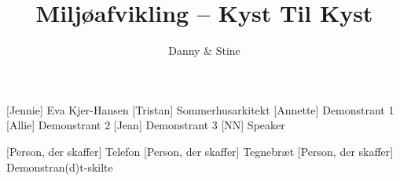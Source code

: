 \documentclass[a4paper,11pt]{article}
\title{Miljøafvikling -- Kyst Til Kyst}
\author{Danny \& Stine}
\begin{document}
\maketitle

\begin{roles}
    [Jennie] Eva Kjer-Hansen
    [Tristan] Sommerhusarkitekt
    [Annette] Demonstrant 1
    [Allie] Demonstrant 2
    [Jean] Demonstrant 3
    [NN] Speaker
\end{roles}

\begin{props}
    [Person, der skaffer] Telefon 
    [Person, der skaffer] Tegnebræt
    [Person, der skaffer] Demonstran(d)t-skilte
\end{props}
\end{document}
